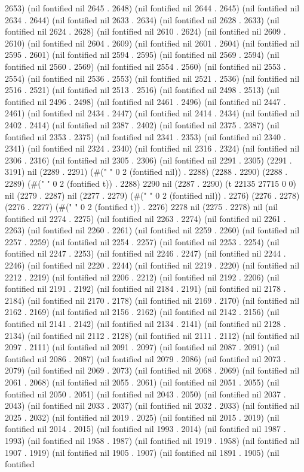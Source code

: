 2653) (nil fontified nil 2645 . 2648) (nil fontified nil 2644 . 2645) (nil fontified nil 2634 . 2644) (nil fontified nil 2633 . 2634) (nil fontified nil 2628 . 2633) (nil fontified nil 2624 . 2628) (nil fontified nil 2610 . 2624) (nil fontified nil 2609 . 2610) (nil fontified nil 2604 . 2609) (nil fontified nil 2601 . 2604) (nil fontified nil 2595 . 2601) (nil fontified nil 2594 . 2595) (nil fontified nil 2569 . 2594) (nil fontified nil 2560 . 2569) (nil fontified nil 2554 . 2560) (nil fontified nil 2553 . 2554) (nil fontified nil 2536 . 2553) (nil fontified nil 2521 . 2536) (nil fontified nil 2516 . 2521) (nil fontified nil 2513 . 2516) (nil fontified nil 2498 . 2513) (nil fontified nil 2496 . 2498) (nil fontified nil 2461 . 2496) (nil fontified nil 2447 . 2461) (nil fontified nil 2434 . 2447) (nil fontified nil 2414 . 2434) (nil fontified nil 2402 . 2414) (nil fontified nil 2387 . 2402) (nil fontified nil 2375 . 2387) (nil fontified nil 2353 . 2375) (nil fontified nil 2341 . 2353) (nil fontified nil 2340 . 2341) (nil fontified nil 2324 . 2340) (nil fontified nil 2316 . 2324) (nil fontified nil 2306 . 2316) (nil fontified nil 2305 . 2306) (nil fontified nil 2291 . 2305) (2291 . 3191) nil (2289 . 2291) (#("  " 0 2 (fontified nil)) . 2288) (2288 . 2290) (2288 . 2289) (#("  " 0 2 (fontified t)) . 2288) 2290 nil (2287 . 2290) (t 22135 27715 0 0) nil (2279 . 2287) nil (2277 . 2279) (#("  " 0 2 (fontified nil)) . 2276) (2276 . 2278) (2276 . 2277) (#("  " 0 2 (fontified t)) . 2276) 2278 nil (2275 . 2278) nil (nil fontified nil 2274 . 2275) (nil fontified nil 2263 . 2274) (nil fontified nil 2261 . 2263) (nil fontified nil 2260 . 2261) (nil fontified nil 2259 . 2260) (nil fontified nil 2257 . 2259) (nil fontified nil 2254 . 2257) (nil fontified nil 2253 . 2254) (nil fontified nil 2247 . 2253) (nil fontified nil 2246 . 2247) (nil fontified nil 2244 . 2246) (nil fontified nil 2220 . 2244) (nil fontified nil 2219 . 2220) (nil fontified nil 2212 . 2219) (nil fontified nil 2206 . 2212) (nil fontified nil 2192 . 2206) (nil fontified nil 2191 . 2192) (nil fontified nil 2184 . 2191) (nil fontified nil 2178 . 2184) (nil fontified nil 2170 . 2178) (nil fontified nil 2169 . 2170) (nil fontified nil 2162 . 2169) (nil fontified nil 2156 . 2162) (nil fontified nil 2142 . 2156) (nil fontified nil 2141 . 2142) (nil fontified nil 2134 . 2141) (nil fontified nil 2128 . 2134) (nil fontified nil 2112 . 2128) (nil fontified nil 2111 . 2112) (nil fontified nil 2097 . 2111) (nil fontified nil 2091 . 2097) (nil fontified nil 2087 . 2091) (nil fontified nil 2086 . 2087) (nil fontified nil 2079 . 2086) (nil fontified nil 2073 . 2079) (nil fontified nil 2069 . 2073) (nil fontified nil 2068 . 2069) (nil fontified nil 2061 . 2068) (nil fontified nil 2055 . 2061) (nil fontified nil 2051 . 2055) (nil fontified nil 2050 . 2051) (nil fontified nil 2043 . 2050) (nil fontified nil 2037 . 2043) (nil fontified nil 2033 . 2037) (nil fontified nil 2032 . 2033) (nil fontified nil 2025 . 2032) (nil fontified nil 2019 . 2025) (nil fontified nil 2015 . 2019) (nil fontified nil 2014 . 2015) (nil fontified nil 1993 . 2014) (nil fontified nil 1987 . 1993) (nil fontified nil 1958 . 1987) (nil fontified nil 1919 . 1958) (nil fontified nil 1907 . 1919) (nil fontified nil 1905 . 1907) (nil fontified nil 1891 . 1905) (nil fontified 